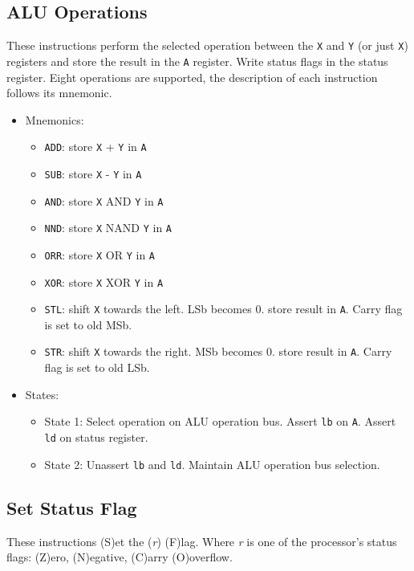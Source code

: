 \documentclass[a4paper,12pt]{article}
\newcommand{\Ar}{\texttt{A}}
\newcommand{\Xr}{\texttt{X}}
\newcommand{\Yr}{\texttt{Y}}
\newcommand\rr{\textit{r}}
\begin{document}
\subsection{ALU Operations}
These instructions perform the selected operation between the \Xr{} and \Yr
(or just \Xr{}) registers and store the result in the \Ar{} register. Write
status flags in the status register. Eight operations are supported, the
description of each instruction follows its mnemonic.
\par

\begin{itemize}
\item Mnemonics:
\begin{itemize}
	\item \texttt{ADD}: store \Xr{} + \Yr{} in \Ar{}
	\item \texttt{SUB}: store \Xr{} - \Yr{} in \Ar{}
	\item \texttt{AND}: store \Xr{} AND \Yr{} in \Ar{}
	\item \texttt{NND}: store \Xr{} NAND \Yr{} in \Ar{}
	\item \texttt{ORR}: store \Xr{} OR \Yr{} in \Ar{}
	\item \texttt{XOR}: store \Xr{} XOR \Yr{} in \Ar{}
	\item \texttt{STL}: shift \Xr{} towards the left. LSb becomes 0. store
	result in \Ar{}. Carry flag is set to old MSb.
	\item \texttt{STR}: shift \Xr{} towards the right. MSb becomes 0. store
	result in \Ar{}. Carry flag is set to old LSb.
\end{itemize}
\item States: 
\begin{itemize}
	\item State 1: Select operation on ALU operation bus. Assert 
	\texttt{lb} on \Ar{}. Assert \texttt{ld} on status register.
	\item State 2: Unassert \texttt{lb} and \texttt{ld}. Maintain ALU 
	operation bus selection.
\end{itemize}
\end{itemize}

\subsection{Set Status Flag}
These instructions (S)et the (\rr{}) (F)lag. Where \rr{} is one of the
processor's status flags: (Z)ero, (N)egative, (C)arry (O)overflow.
\par
\end{document}
